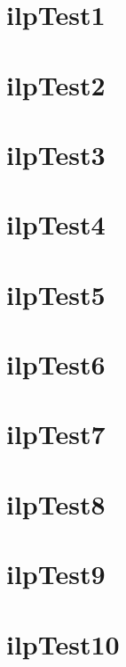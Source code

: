 \section{ilpTest1}
\section{ilpTest2}
\section{ilpTest3}
\section{ilpTest4}
\section{ilpTest5}
\section{ilpTest6}
\section{ilpTest7}
\section{ilpTest8}
\section{ilpTest9}
\section{ilpTest10}
